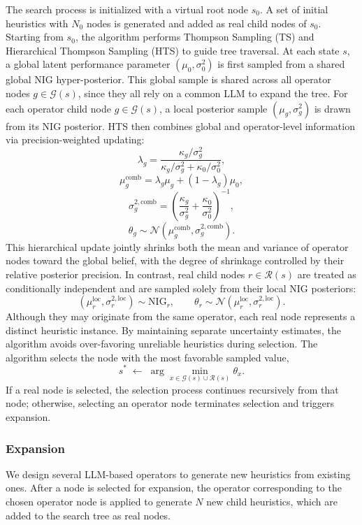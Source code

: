 \documentclass[sigconf,anonymous]{aamas}
\begin{document}
The search process is initialized with a virtual root node \( s_0 \). A set of initial heuristics with \( N_0 \) nodes is generated and added as real child nodes of \( s_0 \). Starting from \( s_0 \), the algorithm performs Thompson Sampling (TS) and Hierarchical Thompson Sampling (HTS) to guide tree traversal. At each state \( s \), a global latent performance parameter \( (\mu_0, \sigma_0^2) \) is first sampled from a shared global NIG hyper-posterior. This global sample is shared across all operator nodes \( g \in \mathcal{G}(s) \), since they all rely on a common LLM to expand the tree. For each operator child node \( g \in \mathcal{G}(s) \), a local posterior sample \( (\mu_g, \sigma_g^2) \) is drawn from its NIG posterior. HTS then combines global and operator-level information via precision-weighted updating:
\[
\lambda_g
= \frac{\kappa_g / \sigma_g^2}{\kappa_g / \sigma_g^2 + \kappa_0 / \sigma_0^2},
\]
\[
\mu_g^{\text{comb}}
= \lambda_g \mu_g + (1-\lambda_g)\mu_0,
\]
\[
\sigma_g^{2,\text{comb}}
= \left( \frac{\kappa_g}{\sigma_g^2} + \frac{\kappa_0}{\sigma_0^2} \right)^{-1},
\]
\[
\theta_g
\sim \mathcal{N}\!\left(\mu_g^{\text{comb}}, \sigma_g^{2,\text{comb}}\right).
\]
This hierarchical update jointly shrinks both the mean and variance of operator nodes toward the global belief, with the degree of shrinkage controlled by their relative posterior precision. In contrast, real child nodes \( r \in \mathcal{R}(s) \) are treated as conditionally independent and are sampled solely from their local NIG posteriors:
\[
(\mu_r^{\text{loc}}, \sigma_r^{2,\text{loc}}) \sim \text{NIG}_r,
\qquad
\theta_r \sim \mathcal{N}(\mu_r^{\text{loc}}, \sigma_r^{2,\text{loc}}).
\]
Although they may originate from the same operator, each real node represents a distinct heuristic instance. By maintaining separate uncertainty estimates, the algorithm avoids over-favoring unreliable heuristics during selection. The algorithm selects the node with the most favorable sampled value,
\[
s^* \;\gets\; \arg\min_{x \in \mathcal{G}(s) \cup \mathcal{R}(s)} \theta_x .
\]
If a real node is selected, the selection process continues recursively from that node; otherwise, selecting an operator node terminates selection and triggers expansion.



\subsubsection{Expansion}

We design several LLM-based operators to generate new heuristics from existing ones. After a node is selected for expansion, the operator corresponding to the chosen operator node is applied to generate $N$ new child heuristics, which are added to the search tree as real nodes.
\end{document}
